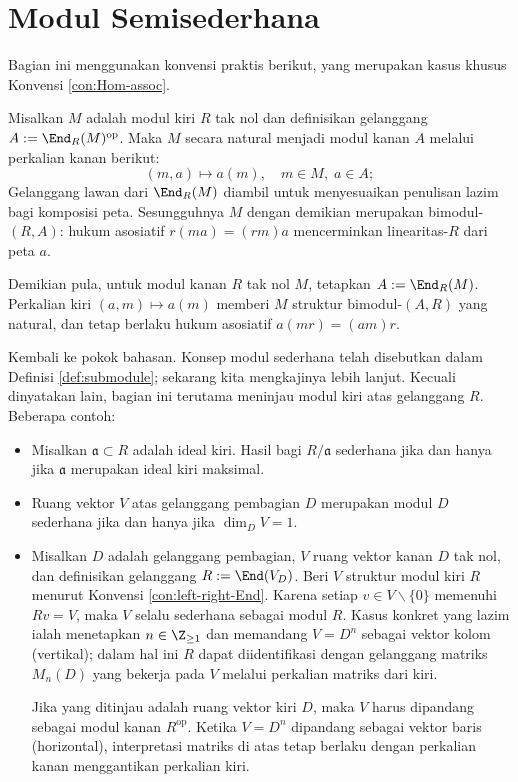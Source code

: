 \section{Modul Semisederhana}
Bagian ini menggunakan konvensi praktis berikut, yang merupakan kasus khusus Konvensi \ref{con:Hom-assoc}.
\begin{convention}\label{con:left-right-End}
	Misalkan $M$ adalah modul kiri $R$ tak nol dan definisikan gelanggang $A := \End_R(M)^\text{op}$. Maka $M$ secara natural menjadi modul kanan $A$ melalui perkalian kanan berikut:
	\[ (m, a) \mapsto a(m), \quad m \in M, \; a \in A;  \]
Gelanggang lawan dari $\End_R(M)$ diambil untuk menyesuaikan penulisan lazim bagi komposisi peta. Sesungguhnya $M$ dengan demikian merupakan bimodul-$(R,A)$: hukum asosiatif $r(ma) = (rm)a$ mencerminkan linearitas-$R$ dari peta $a$.

	Demikian pula, untuk modul kanan $R$ tak nol $M$, tetapkan $A := \End_R(M)$. Perkalian kiri $(a, m) \mapsto a(m)$ memberi $M$ struktur bimodul-$(A,R)$ yang natural, dan tetap berlaku hukum asosiatif $a(mr) = (am)r$.
\end{convention}

Kembali ke pokok bahasan. Konsep modul sederhana telah disebutkan dalam Definisi \ref{def:submodule}; sekarang kita mengkajinya lebih lanjut. Kecuali dinyatakan lain, bagian ini terutama meninjau modul kiri atas gelanggang $R$. Beberapa contoh:
\begin{itemize}
	\item Misalkan $\mathfrak{a} \subset R$ adalah ideal kiri. Hasil bagi $R/\mathfrak{a}$ sederhana jika dan hanya jika $\mathfrak{a}$ merupakan ideal kiri maksimal.
	\item Ruang vektor $V$ atas gelanggang pembagian $D$ merupakan modul $D$ sederhana jika dan hanya jika $\dim_D V = 1$.
	\item Misalkan $D$ adalah gelanggang pembagian, $V$ ruang vektor kanan $D$ tak nol, dan definisikan gelanggang $R := \End(V_D)$. Beri $V$ struktur modul kiri $R$ menurut Konvensi \ref{con:left-right-End}. Karena setiap $v \in V \smallsetminus \{0\}$ memenuhi $Rv = V$, maka $V$ selalu sederhana sebagai modul $R$. Kasus konkret yang lazim ialah menetapkan $n \in \Z_{\geq 1}$ dan memandang $V = D^n$ sebagai vektor kolom (vertikal); dalam hal ini $R$ dapat diidentifikasi dengan gelanggang matriks $M_n(D)$ yang bekerja pada $V$ melalui perkalian matriks dari kiri.

	Jika yang ditinjau adalah ruang vektor kiri $D$, maka $V$ harus dipandang sebagai modul kanan $R^\text{op}$. Ketika $V = D^n$ dipandang sebagai vektor baris (horizontal), interpretasi matriks di atas tetap berlaku dengan perkalian kanan menggantikan perkalian kiri.
\end{itemize}


